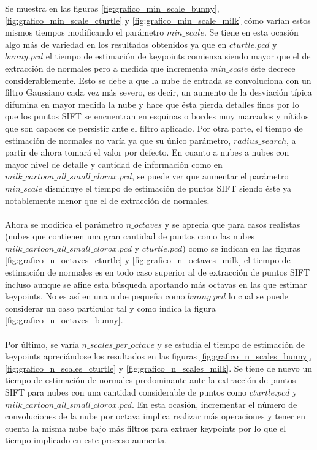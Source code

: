Se muestra en las figuras \ref{fig:grafico_min_scale_bunny}, \ref{fig:grafico_min_scale_cturtle} y \ref{fig:grafico_min_scale_milk} cómo varían estos mismos tiempos modificando el parámetro $min\_scale$. Se tiene en esta ocasión algo más de variedad en los resultados obtenidos ya que en $cturtle.pcd$ y $bunny.pcd$ el tiempo de estimación de keypoints comienza siendo mayor que el de extracción de normales pero a medida que incrementa $min\_scale$ éste decrece considerablemente. Esto se debe a que la nube de entrada se convoluciona con un filtro Gaussiano cada vez más severo, es decir, un aumento de la desviación típica difumina en mayor medida la nube y hace que ésta pierda detalles finos por lo que los puntos SIFT se encuentran en esquinas o bordes muy marcados y nítidos que son capaces de persistir ante el filtro aplicado. Por otra parte, el tiempo de estimación de normales no varía ya que su único parámetro, $radius\_search$, a partir de ahora tomará el valor por defecto. En cuanto a nubes a nubes con mayor nivel de detalle y cantidad de información como en $milk\_cartoon\_all\_small\_clorox.pcd$, se puede ver que aumentar el parámetro $min\_scale$ disminuye el tiempo de estimación de puntos SIFT siendo éste ya notablemente menor que el de extracción de normales.
\\
\\
Ahora se modifica el parámetro $n\_octaves$ y se aprecia que para casos realistas (nubes que contienen una gran cantidad de puntos como las nubes $milk\_cartoon\_all\_small\_clorox.pcd$ y $cturtle.pcd$) como se indican en las figuras \ref{fig:grafico_n_octaves_cturtle} y \ref{fig:grafico_n_octaves_milk} el tiempo de estimación de normales es en todo caso superior al de extracción de puntos SIFT incluso aunque se afine esta búsqueda aportando  más octavas en las que estimar keypoints. No es así en una nube pequeña como $bunny.pcd$ lo cual se puede considerar un caso particular tal y como indica la figura \ref{fig:grafico_n_octaves_bunny}.
\\
\\
Por último, se varía $n\_scales\_per\_octave$ y se estudia el tiempo de estimación de keypoints  apreciándose los resultados en las figuras \ref{fig:grafico_n_scales_bunny}, \ref{fig:grafico_n_scales_cturtle} y \ref{fig:grafico_n_scales_milk}. Se tiene de nuevo un tiempo de estimación de normales predominante ante la extracción de puntos SIFT para nubes con una cantidad considerable de puntos como $cturtle.pcd$ y $milk\_cartoon\_all\_small\_clorox.pcd$. En esta ocasión, incrementar el número de convoluciones de la nube por octava implica realizar más operaciones y tener en cuenta la misma nube bajo más filtros para extraer keypoints por lo que el tiempo implicado en este proceso aumenta.


